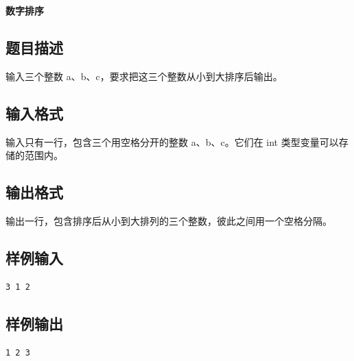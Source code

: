 \documentclass{article}
\newcommand{\problemname}[1]{\begin{center}\Large\bfseries #1\end{center}}
\begin{document}
\problemname{数字排序}

\subsection*{题目描述}
输入三个整数 a、b、c，要求把这三个整数从小到大排序后输出。

\subsection*{输入格式}
输入只有一行，包含三个用空格分开的整数 a、b、c。它们在 int 类型变量可以存储的范围内。

\subsection*{输出格式}
输出一行，包含排序后从小到大排列的三个整数，彼此之间用一个空格分隔。

\subsection*{样例输入}
\begin{verbatim}
3 1 2
\end{verbatim}

\subsection*{样例输出}
\begin{verbatim}
1 2 3
\end{verbatim}
\end{document}
